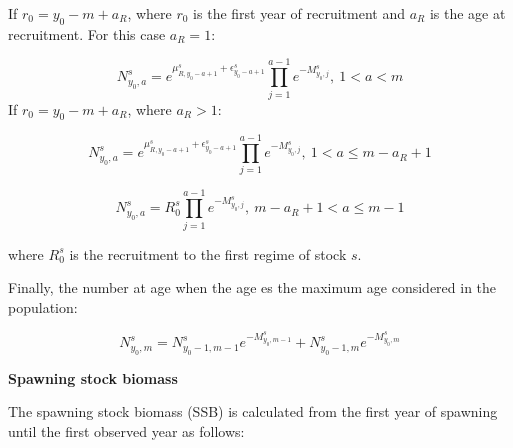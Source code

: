 \documentclass{article}
\begin{document}
If $r_0 = y_0-m+a_R$, where $r_0$ is the first year of recruitment and $a_R$ is the age at recruitment. For this case $a_R=1$:

\begin{equation}
N^s_{y_0,a}=e^{\mu_{R,y_0-a+1}^s + \epsilon^s_{y_0-a+1}}
            \prod_{j=1}^{a-1}e^{-M^s_{y_0,j}}, \ 1<a<m
\end{equation}
If $r_0 = y_0-m+a_R$, where $a_R>1$:

\begin{equation}
N^s_{y_0,a}=e^{\mu_{R,y_0-a+1}^s + \epsilon^s_{y_0-a+1}}                          \prod_{j=1}^{a-1}e^{-M^s_{y_0,j}}, \ 1<a\leq m-a_R+1
\end{equation}

\begin{equation}
N^s_{y_0,a}=R_0^s\prod_{j=1}^{a-1}e^{-M^s_{y_0,j}}, \ m-a_R+1<a\leq m-1
\end{equation}

where $R_0^s$ is the recruitment to the first regime of stock $s$.

Finally, the number at age when the age es the maximum age considered in the population:

\begin{equation}
N^s_{y_0,m}=N^s_{y_0-1,m-1}e^{-M^s_{y_0,m-1}}+N^s_{y_0-1,m}e^{-M^s_{y_0,m}}
\end{equation}




\textbf{Spawning stock biomass}

The spawning stock biomass (SSB) is calculated from the first year of spawning until the first observed year as follows:
\end{document}
